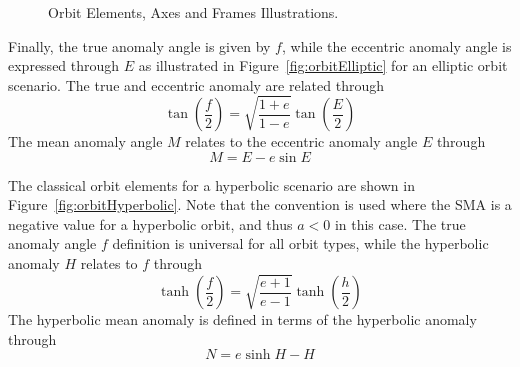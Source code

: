 \begin{figure}[t]
	\caption{Orbit Elements, Axes and Frames Illustrations.\cite{schaub}}
	\label{fig:orbitParameters}
\end{figure}

Finally, the true anomaly angle is given by $f$, while the eccentric anomaly angle is expressed through $E$ as illustrated in Figure~\ref{fig:orbitElliptic} for an elliptic orbit scenario.  The true and eccentric anomaly are related through\cite{schaub}
\begin{equation}
	\tan\left( \frac{f}{2} \right) = \sqrt{ \frac{1+e}{1-e} } \tan\left( \frac{E}{2} \right) 
\end{equation}
The mean anomaly angle $M$ relates to the eccentric anomaly angle $E$ through\cite{schaub}
\begin{equation}
	M = E - e \sin E
\end{equation}

The classical orbit elements for a hyperbolic scenario are shown in Figure~\ref{fig:orbitHyperbolic}.  Note that the convention is used where the SMA is a negative value for a hyperbolic orbit, and thus $a < 0$ in this case.  The true anomaly angle $f$ definition is universal for all orbit types, while the hyperbolic anomaly $H$ relates to $f$ through
\begin{equation}
	\tanh\left( \frac{f}{2} \right) = \sqrt{ \frac{e+1}{e-1}} \tanh\left( \frac{h}{2} \right) 
\end{equation}
The hyperbolic mean anomaly is defined in terms of the hyperbolic anomaly through
\begin{equation}
	N = e \sinh H - H
\end{equation}


